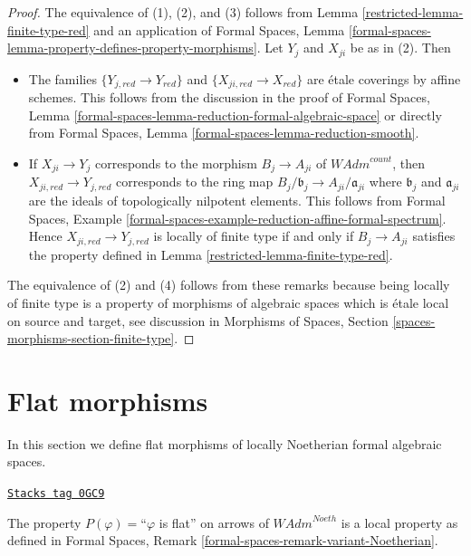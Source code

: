 \begin{proof}

The equivalence of (1), (2), and (3) follows from
Lemma \ref{restricted-lemma-finite-type-red} and an application of
Formal Spaces, Lemma
\ref{formal-spaces-lemma-property-defines-property-morphisms}.
Let $Y_j$ and $X_{ji}$ be as in (2). Then
\begin{itemize}
\item The families $\{Y_{j, red} \to Y_{red}\}$ and
$\{X_{ji, red} \to X_{red}\}$ are \'etale coverings by affine schemes.
This follows from the discussion in the proof of
Formal Spaces, Lemma
\ref{formal-spaces-lemma-reduction-formal-algebraic-space}
or directly from
Formal Spaces, Lemma \ref{formal-spaces-lemma-reduction-smooth}.
\item If $X_{ji} \to Y_j$ corresponds to the morphism
$B_j \to A_{ji}$ of $\textit{WAdm}^{count}$, then
$X_{ji, red} \to Y_{j, red}$ corresponds to the ring map
$B_j/\mathfrak b_j \to A_{ji}/\mathfrak a_{ji}$ where
$\mathfrak b_j$ and $\mathfrak a_{ji}$ are the ideals of
topologically nilpotent elements. This follows from
Formal Spaces, Example
\ref{formal-spaces-example-reduction-affine-formal-spectrum}.
Hence $X_{ji, red} \to Y_{j, red}$ is locally of finite type
if and only if $B_j \to A_{ji}$ satisfies the
property defined in Lemma \ref{restricted-lemma-finite-type-red}.
\end{itemize}
The equivalence of (2) and (4) follows from these remarks because
being locally of finite type is a property of morphisms of algebraic
spaces which is \'etale local on source and target, see discussion in
Morphisms of Spaces, Section \ref{spaces-morphisms-section-finite-type}.
\end{proof}

\section{Flat morphisms}
\label{restricted-section-flat}
In this section we define flat morphisms of locally Noetherian formal
algebraic spaces.

\begin{lemma}
\label{restricted-lemma-flat-axioms}
\href{https://stacks.math.columbia.edu/tag/0GC9}{\texttt{Stacks tag 0GC9}}

The property $P(\varphi)=$``$\varphi$ is flat'' on arrows
of $\textit{WAdm}^{Noeth}$ is a local property as defined in
Formal Spaces, Remark \ref{formal-spaces-remark-variant-Noetherian}.
\end{lemma}

